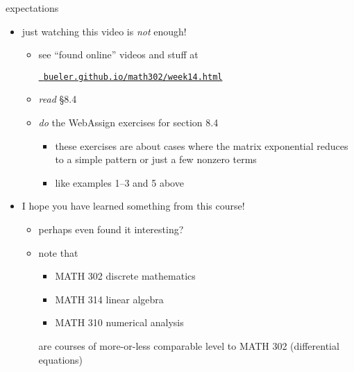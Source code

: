 \documentclass[urlcolor=blue,dvipsnames]{beamer}
\begin{document}
\begin{frame}{expectations}

\begin{itemize}
\item just watching this video is \emph{not} enough!
     \begin{itemize}
     \item see ``found online'' videos and stuff at

     \centerline{\href{https://bueler.github.io/math302/week14.html}{\tt \color{cyan} bueler.github.io/math302/week14.html}}
     \item \emph{read} \S8.4
     \item \emph{do} the WebAssign exercises for section 8.4
         \begin{itemize}
         \item these exercises are about cases where the matrix exponential reduces to a simple pattern or just a few nonzero terms
         \item like examples 1--3 and 5 above
         \end{itemize}
     \end{itemize}

\bigskip
\item I hope you have learned something from this course!
     \begin{itemize}
     \item perhaps even found it interesting?
     \item note that
         \begin{itemize}
         \item MATH 302 discrete mathematics
         \item MATH 314 linear algebra
         \item MATH 310 numerical analysis
         \end{itemize}
     are courses of more-or-less comparable level to MATH 302 (differential equations)
     \end{itemize}
\end{itemize}
\end{frame}
\end{document}
